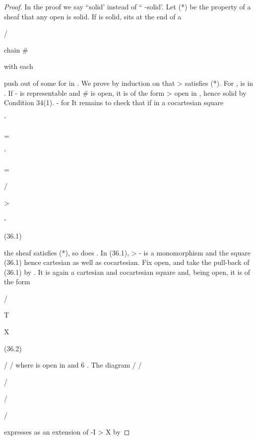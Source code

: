 \documentclass[11pt,a4paper]{article}
\theoremstyle{plain}
\theoremstyle{definition}
\begin{document}
\begin{proof} In the proof we say ``solid' instead of `` -solid'. Let (*) be the property of
a sheaf that any open
is solid. If is solid, sits at the end of a

 /



chain \#

with each 


  push out of some
for
in
.
We
prove
by
induction
on
that
>
 satisfies (*).
For
, 
is in . If
- is representable and \#
 is
open, it is of the form >
open in , hence solid by Condition 34(1).
- for
It remains to check that if in a cocartesian square

'





 =







'

=

 /

  


>



-

(36.1)



the sheaf  satisfies (*), so does . In (36.1), >
- is a monomorphism and
the square (36.1) hence cartesian as well as cocartesian.
Fix
open, and take the pull-back of (36.1) by . It is again a
cartesian and cocartesian square and, being open, it is of the form

 /





  


T

X

(36.2)

/   /
where  is open in  and 6
  . The diagram
/   / 




 






 


/  

/ 

/

expresses
as an extension of -I > X by
\end{proof}
\end{document}

